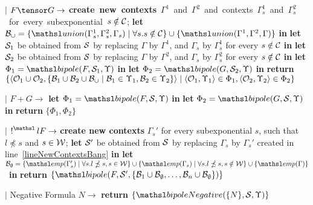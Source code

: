 \begin{algorithm}[pth]
\begin{small}
\begin{algorithmic}[1]
\STATE $\mid$ $F \tensor G \rightarrow$ 
\STATE \qquad \mbox{\textbf{create new contexts} $\Gamma^1$ and
$\Gamma^2$ and contexts $\Gamma^1_s$
and $\Gamma^2_s$ for every subexponential $s\notin {\cal C}$;}
\STATE \qquad \textbf{let} $\groundSet_\cup =
\{\union{\Gamma^1_s}{\Gamma^2_s}{\Gamma_s} \mid \forall s. s \notin \Cscr\}
\cup \{\union{\Gamma^1}{\Gamma^2}{\Gamma}\}$ \textbf{in}
\STATE \qquad \textbf{let} ${\cal S}_1$ be obtained from ${\cal S}$ by
replacing $\Gamma$ by $\Gamma^1$, and  $\Gamma_s$ by
$\Gamma^1_s$ for every $s \notin {\cal C}$ \textbf{in}
\STATE \qquad \textbf{let} ${\cal S}_2$ be obtained from ${\cal S}$ by
replacing $\Gamma$ by $\Gamma^2$, and $\Gamma_s$ by
$\Gamma^2_s$ for every $s\notin {\cal C}$ \textbf{in}
\STATE \qquad \textbf{let} $\Phi_1 =
\bipole(F, \Sscr_1, \Upsilon)$ \textbf{in}
\textbf{let} $\Phi_2 =
\bipole(G, \Sscr_2, \Upsilon)$ \textbf{in}
\STATE \qquad \mbox{\textbf{return} $\{\langle{\cal O}_1 \cup {\cal O}_2,
\{ \mathcal{B}_1
\cup \mathcal{B}_2 \cup \mathcal{B}_\cup \mid \mathcal{B}_1 \in \Upsilon_1,
\mathcal{B}_2 \in \Upsilon_2 \}\rangle \mid \langle{\cal O}_1, \Upsilon_1\rangle \in \Phi_1,
\langle{\cal O}_2,
\Upsilon_2\rangle \in \Phi_2\}$}

\STATE $\mid$ $F \plus G \rightarrow$ 
\STATE \qquad \textbf{let} $\Phi_1 =
\bipole(F, \Sscr, \Upsilon)$ \textbf{in}
\textbf{let} $\Phi_2 =
\bipole(G, \Sscr, \Upsilon)$ \textbf{in}
\STATE \qquad \textbf{return} $\{ \Phi_1, \Phi_2 \}$

\STATE $\mid$ $\nbang{l} F \rightarrow$ 
\STATE \qquad \textbf{create new contexts} $\Gamma_s'$ for every
subexponential $s$, such that $l \npreceq s$ and $s \in {\cal W}$;
\label{lineNewContextsBang}
\STATE \qquad \textbf{let} ${\cal S}'$ be obtained from ${\cal S}$ by
replacing $\Gamma_s$ by $\Gamma_s'$ created in
line~\ref{lineNewContextsBang} \textbf{in} 
\STATE \qquad \mbox{\textbf{let} $\groundSet_\emptyset =
\{\emp{\Gamma_s'} \mid \forall s. l \npreceq s, s \in \Wscr\} \cup \{
  \emp{\Gamma_s} \mid \forall s. l \npreceq s, s \notin \Wscr \} \cup \{
    \emp{\Gamma} \}$
\textbf{in}}
\STATE \qquad \textbf{return} $\{ \bipole(F, \Sscr', \{\groundSet_1 \cup
\groundSet_\emptyset, \ldots, \groundSet_n \cup \groundSet_\emptyset\}) \}$

\STATE $\mid$ Negative Formula $N \rightarrow$ 
\STATE \qquad \textbf{return} $\{ \bipoleAux(\{N\}, \Sscr, \Upsilon) \}$
\end{algorithmic}


\end{small}
\end{algorithm}
